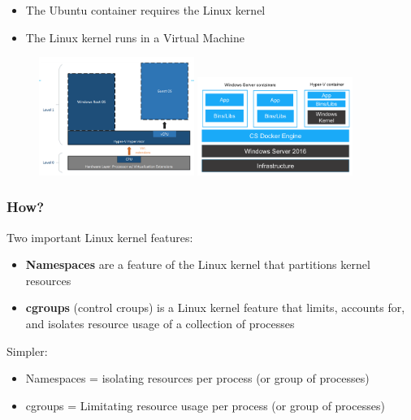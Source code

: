 \documentclass{article}
\newcommand{\bold}[1]{\textbf{#1}}
\begin{document}
\begin{itemize}
    \item The Ubuntu container requires the Linux kernel
    \item The Linux kernel runs in a Virtual Machine
\end{itemize}

\begin{figure}[H]
    \centering
    \includegraphics[width=0.45\textwidth]{kernel3.png}
    \includegraphics[width=0.45\textwidth]{kernel4.png}
    \caption{}
\end{figure}

\subsubsection{How?}

Two important Linux kernel features:

\begin{itemize}
    \item \bold{Namespaces} are a feature of the Linux kernel that partitions kernel resources
    \item \bold{cgroups} (control croups) is a Linux kernel feature that limits, accounts for, and isolates resource usage of a collection of processes 
\end{itemize}

Simpler:

\begin{itemize}
    \item Namespaces = isolating resources per process (or group of processes)
    \item cgroups = Limitating resource usage per process (or group of processes)
\end{itemize}
\end{document}
